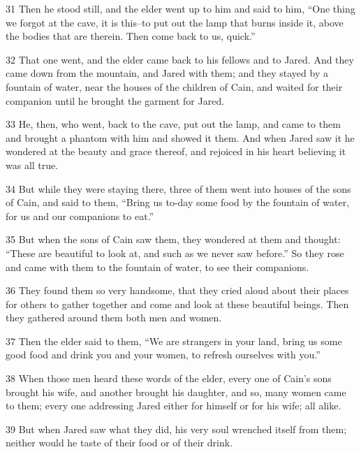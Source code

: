 \par 31 Then he stood still, and the elder went up to him and said to him, “One thing we forgot at the cave, it is this--to put out the lamp that burns inside it, above the bodies that are therein. Then come back to us, quick.”

\par 32 That one went, and the elder came back to his fellows and to Jared. And they came down from the mountain, and Jared with them; and they stayed by a fountain of water, near the houses of the children of Cain, and waited for their companion until he brought the garment for Jared.

\par 33 He, then, who went, back to the cave, put out the lamp, and came to them and brought a phantom with him and showed it them. And when Jared saw it he wondered at the beauty and grace thereof, and rejoiced in his heart believing it was all true.

\par 34 But while they were staying there, three of them went into houses of the sons of Cain, and said to them, “Bring us to-day some food by the fountain of water, for us and our companions to eat.”

\par 35 But when the sons of Cain saw them, they wondered at them and thought: “These are beautiful to look at, and such as we never saw before.” So they rose and came with them to the fountain of water, to see their companions.

\par 36 They found them so very handsome, that they cried aloud about their places for others to gather together and come and look at these beautiful beings. Then they gathered around them both men and women.

\par 37 Then the elder said to them, “We are strangers in your land, bring us some good food and drink you and your women, to refresh ourselves with you.”

\par 38 When those men heard these words of the elder, every one of Cain's sons brought his wife, and another brought his daughter, and so, many women came to them; every one addressing Jared either for himself or for his wife; all alike.

\par 39 But when Jared saw what they did, his very soul wrenched itself from them; neither would he taste of their food or of their drink.

